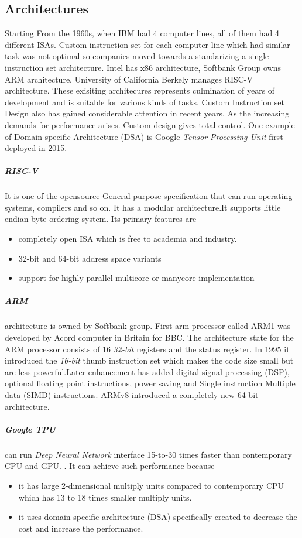 \documentclass[a4paper,12pt]{article}
\begin{document}
    \subsection{Architectures}
    Starting From the 1960s, when IBM had 4 computer lines, all of them had 4 different ISAs. Custom instruction set for each computer line which had similar task was not optimal so companies moved towards a standarizing a single instruction set architecture. Intel has x86 architecture, Softbank Group owns ARM architecture, University of California Berkely manages RISC-V architecture. These exisiting architecures represents culmination of years of development and is suitable for various kinds of tasks.
    Custom Instruction set Design also has gained considerable attention in recent years. As the increasing demands for performance arises. Custom design gives total control. One example of Domain specific Architecture (DSA) is Google \textit{ Tensor Processing Unit} first deployed in 2015. 
    \subparagraph{RISC-V}
    It is one of the opensource General purpose specification that can run operating systems, compilers and so on. It has a modular architecture.It supports little endian byte ordering system. Its primary features are
    \begin{itemize}
        \item  completely open ISA which is free to academia and industry.
        \item 32-bit and 64-bit address space variants
        \item support for highly-parallel multicore or manycore implementation
    \end{itemize}
    \subparagraph{ARM}
     architecture is owned by Softbank group. First arm processor called ARM1 was developed by Acord computer in Britain for BBC. The architecture state for the ARM processor consists of 16 \textit{32-bit} registers and the status register. In 1995 it introduced the \textit{16-bit} thumb instruction set which makes the code size small but are less powerful.Later enhancement has added digital signal processing (DSP), optional floating point instructions, power saving and Single instruction Multiple data (SIMD) instructions. ARMv8 introduced a completely new 64-bit architecture. 

    \subparagraph{Google TPU}
    can run \textit{Deep Neural Network} interface 15-to-30 times faster  than contemporary CPU and GPU. \citebib{}. It can achieve such performance because
    \begin{itemize}
        \item it has large 2-dimensional multiply units compared to contemporary CPU which has 13 to 18 times smaller multiply units.
        \item it uses domain specific architecture (DSA) specifically created to decrease the cost and increase the performance. 
    \end{itemize}
\end{document}
